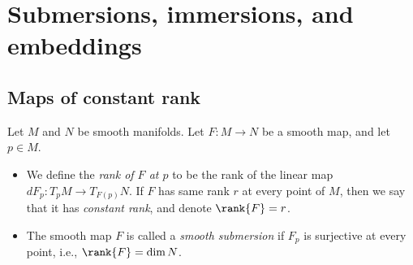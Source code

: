 
\chapter{Submersions, immersions, and embeddings}

\section{Maps of constant rank}

\begin{definition}
    Let $M$ and $N$ be smooth manifolds. Let $F : M \to N$ be a smooth map, and let $p \in M$.
    \begin{itemize}
        \item We define the \emph{rank of $F$ at $p$} to be the rank of the linear map $dF_p : T_pM \to T_{F(p)}N$. If $F$ has same rank $r$ at every point of $M$, then we say that it has \emph{constant rank}, and denote $\rank{F} = r$.
        \item The smooth map $F$ is called a \emph{smooth submersion} if $F_p$ is surjective at every point, i.e., $\rank{F} = \dim{N}$.
    \end{itemize}
\end{definition}
